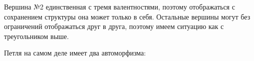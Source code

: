 \begin{enumerate}
    \begin{claim*}
        Вершина №2 единственная с тремя валентностями, поэтому отображаться с сохранением
        структуры она может только в себя. Остальные вершины могут без ограничений отображаться
        друг в друга, поэтому имеем ситуацию как с треугольником выше.
    \end{claim*}
    \begin{notice}
        Петля на самом деле имеет два автоморфизма:
        \begin{center}
        \end{center}
        
    \end{notice}
\end{enumerate}